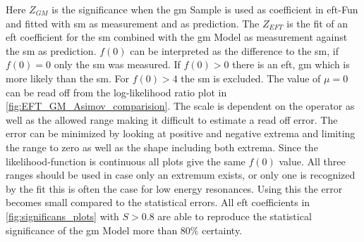 \documentclass[../Bachelorarbeit.tex]{subfiles}
\begin{document}
Here $Z_{GM}$ is the significance when the \acrshort{gm} Sample is used as coefficient in \acrshort{eft}-Fun and fitted with \acrshort{sm} as measurement and as prediction.
The $Z_{EFT}$ is the fit of an \acrshort{eft} coefficient for the \acrshort{sm} combined with the \acrshort{gm} Model as measurement against the \acrshort{sm} as prediction.
$f(0)$ can be interpreted as the difference to the \acrshort{sm}, if $f(0) = 0$ only the \acrshort{sm} was measured. If $f(0)>0$ there is an \acrshort{eft}, \acrshort{gm} which is more likely than the \acrshort{sm}. For $f(0) > 4$ the \acrshort{sm} is excluded.
The value of $\mu=0$ can be read off from the log-likelihood ratio plot in \ref{fig:EFT_GM_Asimov_comparision}. The scale is dependent on
the operator as well as the allowed range making it difficult to estimate a read off error. The error can be minimized by looking at positive and negative extrema and limiting the range to zero as well as the shape including both extrema.
Since the likelihood-function is continuous all plots give the same $f(0)$ value. All three ranges should be used in case only an extremum exists, or only one is recognized by the fit this is often the case for low energy resonances.
Using this the error becomes small compared to the statistical errors. All \acrshort{eft} coefficients in \ref{fig:significans_plots} with $S>0.8$ are able to reproduce the statistical significance of the \acrshort{gm} Model more than $80\%$ certainty.
\end{document}
